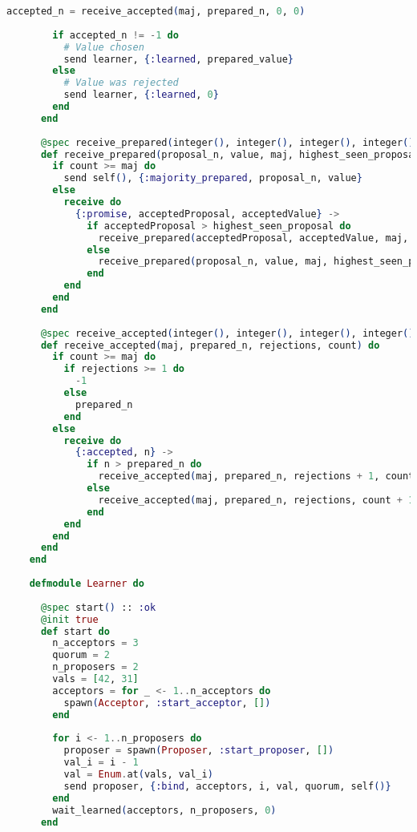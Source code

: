\begin{lstlisting}[language=Elixir, xleftmargin=.1\linewidth]
        accepted_n = receive_accepted(maj, prepared_n, 0, 0)
    
        if accepted_n != -1 do
          # Value chosen
          send learner, {:learned, prepared_value}
        else
          # Value was rejected
          send learner, {:learned, 0}
        end
      end
    
      @spec receive_prepared(integer(), integer(), integer(), integer(), integer()) :: :ok
      def receive_prepared(proposal_n, value, maj, highest_seen_proposal, count) do
        if count >= maj do
          send self(), {:majority_prepared, proposal_n, value}
        else
          receive do
            {:promise, acceptedProposal, acceptedValue} ->
              if acceptedProposal > highest_seen_proposal do
                receive_prepared(acceptedProposal, acceptedValue, maj, acceptedProposal, count + 1) # BUG IS HERE
              else
                receive_prepared(proposal_n, value, maj, highest_seen_proposal, count + 1)
              end
          end
        end
      end
    
      @spec receive_accepted(integer(), integer(), integer(), integer()) :: integer()
      def receive_accepted(maj, prepared_n, rejections, count) do
        if count >= maj do
          if rejections >= 1 do
            -1
          else
            prepared_n
          end
        else
          receive do
            {:accepted, n} ->
              if n > prepared_n do
                receive_accepted(maj, prepared_n, rejections + 1, count + 1)
              else
                receive_accepted(maj, prepared_n, rejections, count + 1)
              end
          end
        end
      end
    end
    
    defmodule Learner do
    
      @spec start() :: :ok
      @init true
      def start do
        n_acceptors = 3
        quorum = 2
        n_proposers = 2
        vals = [42, 31]
        acceptors = for _ <- 1..n_acceptors do
          spawn(Acceptor, :start_acceptor, [])
        end
    
        for i <- 1..n_proposers do
          proposer = spawn(Proposer, :start_proposer, [])
          val_i = i - 1
          val = Enum.at(vals, val_i)
          send proposer, {:bind, acceptors, i, val, quorum, self()}
        end
        wait_learned(acceptors, n_proposers, 0)
      end
    

\end{lstlisting}
